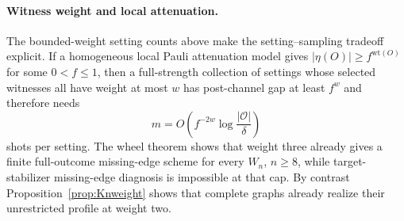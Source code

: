 \documentclass[11pt]{article}
\theoremstyle{remark}
\newcommand{\cO}{\mathcal{O}}
\begin{document}
\paragraph{Witness weight and local attenuation.}
The bounded-weight setting counts above make the setting--sampling tradeoff explicit. If a homogeneous local Pauli attenuation model gives $|\eta(O)|\ge f^{\mathrm{wt}(O)}$ for some $0<f\le1$, then a full-strength collection of settings whose selected witnesses all have weight at most $w$ has post-channel gap at least $f^w$ and therefore needs
\[
 m=O\!\left(f^{-2w}\log\frac{|\cO|}{\delta}\right)
\]
shots per setting. The wheel theorem shows that weight three already gives a finite full-outcome missing-edge scheme for every $W_n$, $n\ge8$, while target-stabilizer missing-edge diagnosis is impossible at that cap. By contrast Proposition~\ref{prop:Knweight} shows that complete graphs already realize their unrestricted profile at weight two.
\end{document}
